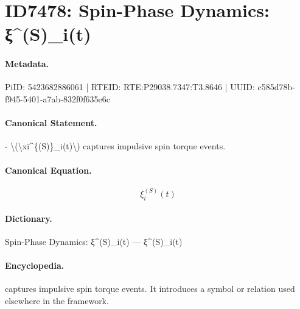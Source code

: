 \section*{ID7478: Spin-Phase Dynamics: ξ\textasciicircum{}(S)\_i(t)}
\paragraph{Metadata.}
PiID: 5423682886061 | RTEID: RTE:P29038.7347:T3.8646 | UUID: c585d78b-f945-5401-a7ab-832f0f635e6c

\paragraph{Canonical Statement.}
- \textbackslash{}(\textbackslash{}xi\textasciicircum{}\{(S)\}\_i(t)\textbackslash{}) captures impulsive spin torque events.

\paragraph{Canonical Equation.}
\[
\xi^{(S)}_i(t)
\]

\paragraph{Dictionary.}
Spin-Phase Dynamics: ξ\textasciicircum{}(S)\_i(t) — ξ\textasciicircum{}(S)\_i(t)

\paragraph{Encyclopedia.}
captures impulsive spin torque events. It introduces a symbol or relation used elsewhere in the framework.
